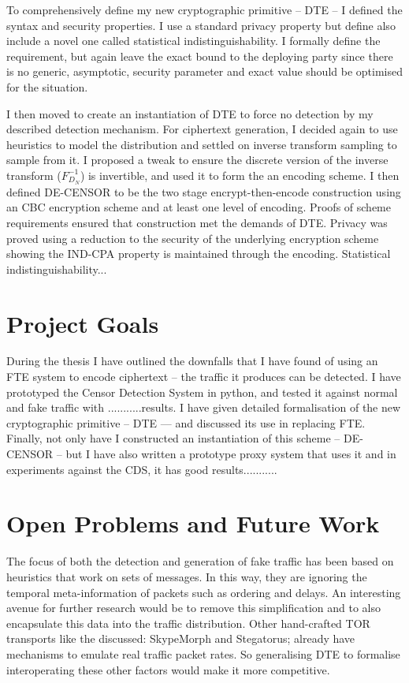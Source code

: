 \documentclass[ %
                    author={Samuel Russell},
                supervisor={Prof. Bogdan Warinschi},
                    degree={MEng},
                     title={Innocuous Ciphertexts},
                  subtitle={The DE-CENSOR Scheme},
                      type={research},
                      year={2018} ]{dissertation}
\begin{document}
To comprehensively define my new cryptographic primitive -- DTE -- I defined the syntax and security properties.
I use a standard privacy property but define also include a novel one called statistical indistinguishability. I formally define the requirement, but again leave the exact bound to the deploying party since there is no generic, asymptotic, security parameter and exact value should be optimised for the situation.

I then moved to create an instantiation of DTE to force no detection by my described detection mechanism.
For ciphertext generation, I decided again to use heuristics to model the distribution and settled on inverse transform sampling to sample from it.
I proposed a tweak to ensure the discrete version of the inverse transform  ($F^{-1}_{D_N}$) is invertible, and used it to form the an encoding scheme.
I then defined DE-CENSOR to be the two stage encrypt-then-encode construction using an CBC encryption scheme and at least one level of encoding.
Proofs of scheme requirements ensured that construction met the demands of DTE.
Privacy was proved using a reduction to the security of the underlying encryption scheme showing the IND-CPA property is maintained through the encoding.
Statistical indistinguishability...

\section{Project Goals}

During the thesis I have outlined the downfalls that I have found of using an FTE system to encode ciphertext -- the traffic it produces can be detected.
I have prototyped the Censor Detection System in python, and tested it against normal and fake traffic with ...........results.
I have given detailed formalisation of the new cryptographic primitive -- DTE --- and discussed its use in replacing FTE.
Finally, not only have I constructed an instantiation of this scheme -- DE-CENSOR -- but I have also written a prototype proxy system that uses it and in experiments against the CDS, it has good results...........

\section{Open Problems and Future Work}

The focus of both the detection and generation of fake traffic has been based on heuristics that work on sets of messages. In this way, they are ignoring the temporal meta-information of packets such as ordering and delays. An interesting avenue for further research would be to remove this simplification and to also encapsulate this data into the traffic distribution. Other hand-crafted TOR transports like the discussed: SkypeMorph and Stegatorus; already have mechanisms to emulate real traffic packet rates. So generalising DTE to formalise interoperating these other factors would make it more competitive.
\end{document}
